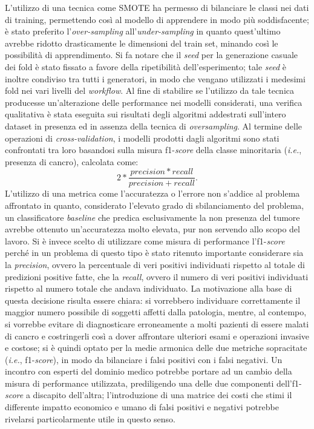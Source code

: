 L'utilizzo di una tecnica come SMOTE ha permesso di bilanciare le classi nei dati di training, permettendo così al modello di apprendere in modo più soddisfacente; è stato preferito l'\textit{over-sampling} all'\textit{under-sampling} in quanto quest'ultimo avrebbe ridotto drasticamente le dimensioni del train set, minando così le possibilità di apprendimento.
Si fa notare che il \textit{seed} per la generazione casuale dei fold è stato fissato a favore della ripetibilità dell'esperimento; tale \textit{seed} è inoltre condiviso tra tutti i generatori, in modo che vengano utilizzati i medesimi fold nei vari livelli del \textit{workflow}.
Al fine di stabilire se l'utilizzo da tale tecnica producesse un'alterazione delle performance nei modelli considerati, una verifica qualitativa è stata eseguita sui risultati degli algoritmi addestrati sull'intero dataset in presenza ed in assenza della tecnica di \textit{oversampling}.
Al termine delle operazioni di \textit{cross-validation}, i modelli prodotti dagli algoritmi sono stati confrontati tra loro basandosi sulla misura f1-\textit{score} della classe minoritaria (\textit{i.e.}, presenza di cancro), calcolata come: \[2 * \frac{precision*recall}{precision+recall}.\]
L'utilizzo di una metrica come l'accuratezza o l'errore non s'addice al problema affrontato in quanto, considerato l'elevato grado di sbilanciamento del problema, un classificatore \textit{baseline} che predica esclusivamente la non presenza del tumore avrebbe ottenuto un'accuratezza molto elevata, pur non servendo allo scopo del lavoro. 
Si è invece scelto di utilizzare come misura di performance l'f1-\textit{score} perché in un problema di questo tipo è stato ritenuto importante considerare sia la \textit{precision}, ovvero la percentuale di veri positivi individuati rispetto al totale di predizioni positive fatte, che la \textit{recall}, ovvero il numero di veri positivi individuati rispetto al numero totale che andava individuato. 
La motivazione alla base di questa decisione risulta essere chiara: si vorrebbero individuare correttamente il maggior numero possibile di soggetti affetti dalla patologia, mentre, al contempo, si vorrebbe evitare di diagnosticare erroneamente a molti pazienti di essere malati di cancro e costringerli così a dover affrontare ulteriori esami e operazioni invasive e costose; si è quindi optato per la medie armonica delle due metriche sopracitate (\textit{i.e.}, f1-\textit{score}), in modo da bilanciare i falsi positivi con i falsi negativi.
Un incontro con esperti del dominio medico potrebbe portare ad un cambio della misura di performance utilizzata, prediligendo una delle due componenti dell'f1-\textit{score} a discapito dell'altra; l'introduzione di una matrice dei costi che stimi il differente impatto economico e umano di falsi positivi e negativi potrebbe rivelarsi particolarmente utile in questo senso.\\
